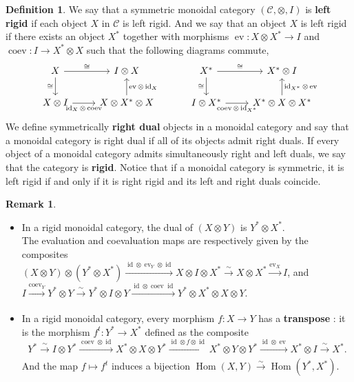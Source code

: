 \documentclass{article}
\theoremstyle{plain}
\theoremstyle{definition}
\newtheorem{definition}[theorem]{Definition}
\newtheorem{remark}{Remark}
\DeclareMathOperator{\Hom}{Hom}
\DeclareMathOperator{\ev}{ev}
\DeclareMathOperator{\coev}{coev}
\DeclareMathOperator{\id}{id}
\begin{document}
\begin{definition}
    We say that a symmetric monoidal category $(\mathcal{C},\otimes,I)$ is \textbf{left rigid} if each object $X$ in $\mathcal{C}$ is left rigid.
    And we say that an object $X$ is left rigid if there exists an object $X^*$ together with morphisms $\ev:X\otimes X^*\rightarrow I$ and
    $\coev:I\rightarrow X^*\otimes X$ such that the following diagrams commute,
    \[
    \begin{tikzcd}
        X 
        \arrow[r,"\cong"] 
        \arrow[d, "\cong"'] & 
        I\otimes X \\
        X\otimes I
        \arrow[r,"\id_X\otimes \coev"'] &  X\otimes X^*\otimes X 
        \arrow[u,"\ev\otimes\id_X"']
    \end{tikzcd}
    \hspace{1cm}
    \begin{tikzcd}
        X^* 
        \arrow[r, "\cong"] 
        \arrow[d,"\cong"']  & 
        X^*\otimes I\\
        I \otimes X^* 
        \arrow[r,"\coev\otimes\id_{X^*}"']  &  
        X^*\otimes X\otimes X^*
        \arrow[u,"\id_{X^*}\otimes \ev"']
    \end{tikzcd}
    \]
    We define symmetrically \textbf{right dual} objects in a monoidal category and say that a monoidal category is right dual if all of its objects admit right duals.
    If every object of a monoidal category admits simultaneously right and left duals, we say that the category is \textbf{rigid}.
    Notice that if a monoidal category is symmetric, it is left rigid if and only if it is right rigid and its left and right duals coincide.
\end{definition}

\begin{remark} \textbf{ }
\begin{itemize}
    \item[$a)$] In a rigid monoidal category,
    the dual of $(X\otimes Y)$ is $Y^*\otimes X^*$.\\
    The evaluation and coevaluation maps are respectively given by the composites \\
    $(X\otimes Y) \otimes (Y^* \otimes X^*) \xrightarrow[]{\id\otimes \ev_Y\otimes \id} X\otimes I\otimes X^*\xrightarrow[]{\sim} X\otimes X^*\xrightarrow[]{\ev_X} I$, and \\
    $I\xrightarrow[]{\coev_Y} Y^*\otimes Y \xrightarrow[]{\sim} Y^*\otimes I\otimes Y \xrightarrow[]{\id\otimes \coev\id} Y^*\otimes X^*\otimes X\otimes Y$.
    
    \item[$b)$] In a rigid monoidal category, every morphism $f:X\rightarrow Y$ has a \textbf{transpose} :
    it is the morphism $f^t: Y^*\rightarrow X^*$ defined as the composite
    $$Y^*\xrightarrow[]{\sim} I\otimes Y^*\xrightarrow[]{\coev\otimes\id} X^*\otimes X\otimes Y^* \xrightarrow[]{\id\otimes f\otimes \id} X^*\otimes Y\otimes Y^* \xrightarrow[]{\id\otimes \ev} X^*\otimes I \xrightarrow[]{\sim} X^*.$$
    And the map $f\mapsto f^t$ induces a bijection $\Hom(X,Y)\xrightarrow[]{\sim}\Hom(Y^*,X^*)$.
\end{itemize}
    
\end{remark}
\end{document}

